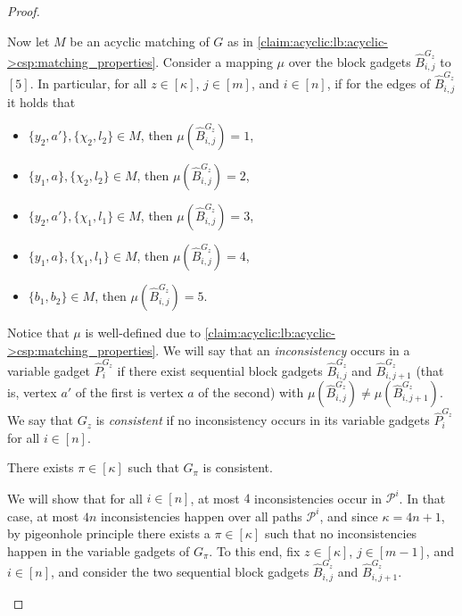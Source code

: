 \begin{proof}
\begin{nestedproof}
            Now let $M$ be an acyclic matching of $G$ as in \cref{claim:acyclic:lb:acyclic->csp:matching_properties}.
            Consider a mapping $\mu$ over the block gadgets $\hat{B}^{G_z}_{i,j}$ to $[5]$.
            In particular, for all $z \in [\kappa]$, $j \in [m]$, and $i \in [n]$, if for the edges of $\hat{B}^{G_z}_{i,j}$ it holds that
            \begin{itemize}
                \item $\{y_2,a'\}, \{\chi_2,l_2\} \in M$, then $\mu(\hat{B}^{G_z}_{i,j}) = 1$,
                \item $\{y_1,a\}, \{\chi_2,l_2\} \in M$, then $\mu(\hat{B}^{G_z}_{i,j}) = 2$,
                \item $\{y_2,a'\}, \{\chi_1,l_1\} \in M$, then $\mu(\hat{B}^{G_z}_{i,j}) = 3$,
                \item $\{y_1,a\}, \{\chi_1,l_1\} \in M$, then $\mu(\hat{B}^{G_z}_{i,j}) = 4$,
                \item $\{b_1,b_2\} \in M$, then $\mu(\hat{B}^{G_z}_{i,j}) = 5$.
            \end{itemize}
            Notice that $\mu$ is well-defined due to \cref{claim:acyclic:lb:acyclic->csp:matching_properties}.
            We will say that an \emph{inconsistency} occurs in a variable gadget $\hat{P}^{G_z}_i$ if there exist
            sequential block gadgets $\hat{B}^{G_z}_{i,j}$ and $\hat{B}^{G_z}_{i,j+1}$ (that is, vertex $a'$ of the first is vertex $a$ of the second)
            with $\mu (\hat{B}^{G_z}_{i,j}) \neq \mu(\hat{B}^{G_z}_{i,j+1})$.
            We say that $G_z$ is \emph{consistent} if no inconsistency occurs in its variable gadgets $\hat{P}^{G_z}_i$ for all $i \in [n]$.

            \begin{claim}
                There exists $\pi \in [\kappa]$ such that $G_\pi$ is consistent.
            \end{claim}

            \begin{claimproof}
                We will show that for all $i \in [n]$, at most $4$ inconsistencies occur in $\mathcal{P}^i$.
                In that case, at most $4n$ inconsistencies happen over all paths $\mathcal{P}^i$,
                and since $\kappa = 4n+1$, by pigeonhole principle there exists a $\pi \in [\kappa]$ such that no inconsistencies
                happen in the variable gadgets of $G_{\pi}$.
                To this end, fix $z \in [\kappa]$, $j \in [m-1]$, and $i \in [n]$,
                and consider the two sequential block gadgets $\hat{B}^{G_z}_{i,j}$ and $\hat{B}^{G_z}_{i,j+1}$.


\end{claimproof}
\end{nestedproof}
\end{proof}
